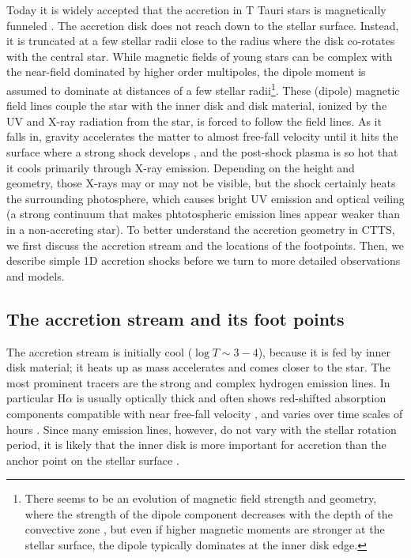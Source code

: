 \documentclass[graybox, nosecnum]{svmult}
\begin{document}
Today it is widely accepted that the accretion in T Tauri stars is magnetically funneled \citep{Hartmann_2016}. The accretion disk does not reach down to the stellar surface. Instead, it is truncated at a few stellar radii close to the radius where the disk co-rotates with the central star. While magnetic fields of young stars can be complex with the near-field dominated by higher order multipoles, the dipole moment is assumed to dominate at distances of a few stellar radii\footnote{There seems to be an evolution of magnetic field strength and geometry, where the strength of the dipole component decreases with the depth of the convective zone \cite{2012ApJ...755...97G,2019A&A...622A..72V}, but even if higher magnetic moments are stronger at the stellar surface, the dipole typically dominates at the inner disk edge.}. These (dipole) magnetic field lines couple the star with the inner disk and disk material, ionized by the UV and X-ray radiation from the star, is forced to follow the field lines. As it falls in, gravity accelerates the matter to almost free-fall velocity until it hits the surface where a strong shock develops \cite{Shu_1994}, and the post-shock plasma is so hot that it cools primarily through X-ray emission.  Depending on the height and geometry, those X-rays may or may not be visible, but the shock certainly heats the surrounding photosphere, which causes bright UV emission and optical veiling (a strong continuum that makes phtotospheric emission lines appear weaker than in a non-accreting star). To better understand the accretion geometry in CTTS, we first discuss the accretion stream and the locations of the footpoints. Then, we describe simple 1D accretion shocks before we turn to more detailed observations and models.

\subsection{The accretion stream and its foot points}
\label{sect:accretionsrteam}
The accretion stream is initially cool ($\log T\sim3-4$), because it is fed by inner disk material; it heats up as mass accelerates and comes closer to the star. The most prominent tracers are the strong and complex hydrogen emission lines. In particular H$\alpha$ is usually optically thick and often shows red-shifted absorption components compatible with near free-fall velocity \cite[e.g.][]{2000AJ....119.1881A}, and varies over time scales of hours \cite{dupree_2012}. Since many emission lines, however, do not vary with the stellar rotation period, it is likely that the inner disk is more important for accretion than the anchor point on the stellar surface \cite{2021A&A...649A..68S}. 
\end{document}
